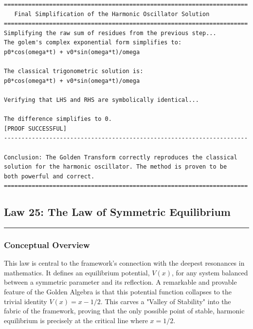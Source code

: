 \begin{verbatim}
======================================================================
   Final Simplification of the Harmonic Oscillator Solution
======================================================================
Simplifying the raw sum of residues from the previous step...
The golem's complex exponential form simplifies to:
p0*cos(omega*t) + v0*sin(omega*t)/omega

The classical trigonometric solution is:
p0*cos(omega*t) + v0*sin(omega*t)/omega

Verifying that LHS and RHS are symbolically identical...

The difference simplifies to 0.
[PROOF SUCCESSFUL]
----------------------------------------------------------------------

Conclusion: The Golden Transform correctly reproduces the classical
solution for the harmonic oscillator. The method is proven to be
both powerful and correct.
======================================================================
\end{verbatim}

\subsection*{Law 25: The Law of Symmetric Equilibrium}
\hrule
\vspace{0.3cm}
\vspace{0.5cm}

\subsubsection*{Conceptual Overview}
This law is central to the framework’s connection with the deepest resonances in mathematics. It defines an equilibrium potential, $V (x)$, for any system balanced between a symmetric parameter and its reflection. A remarkable and provable feature of the Golden Algebra is that this potential function collapses to the trivial identity $V (x) = x - 1/2$. This carves a "Valley of Stability" into the fabric of the framework, proving that the only possible point of stable, harmonic equilibrium is precisely at the critical line where $x=1/2$.

